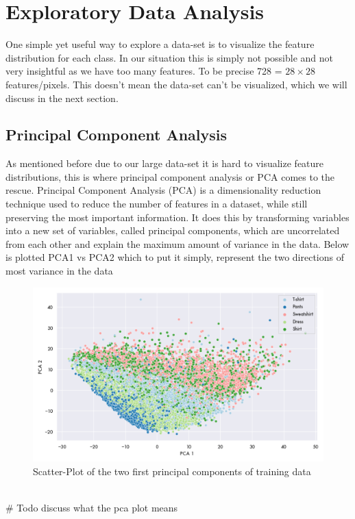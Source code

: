 \section{Exploratory Data Analysis}

One simple yet useful way to explore a data-set is to visualize the feature distribution for each class. In our situation this is simply not possible and not very insightful as we have too many features. To be precise 728 = $28\times28$ features/pixels. This doesn't mean the data-set can't be visualized, which we will discuss in the next section. 


\subsection{Principal Component Analysis}
As mentioned before due to our large data-set it is hard to visualize feature distributions, this is where principal component analysis or PCA comes to the rescue. Principal Component Analysis (PCA) is a dimensionality reduction technique used to reduce the number of features in a dataset, while still preserving the most important information. It does this by transforming variables into a new set of variables, called principal components, which are uncorrelated from each other and explain the maximum amount of variance in the data. Below is plotted PCA1 vs PCA2 which to put it simply, represent the two directions of most variance in the data \\

\begin{figure}[ht]
\centering
\includegraphics[scale=0.5]{figures_for_report/pca_plot}
\captionsetup{justification=centering,margin=2cm}
\caption{Scatter-Plot of the two first principal components of training data}
\label{feature_distribution_classes}
\end{figure} \\

# Todo discuss what the pca plot means